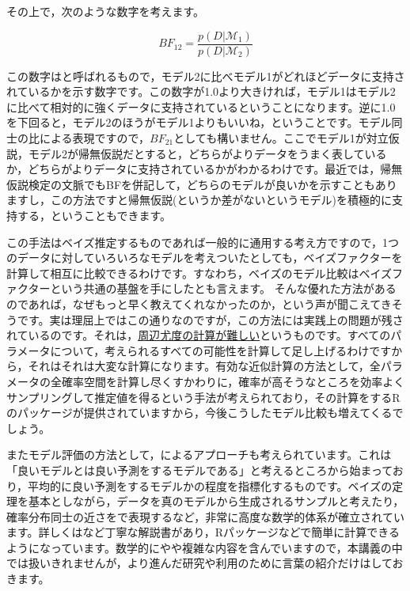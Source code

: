 \documentclass{ltjsbook}
\begin{document}
その上で，次のような数字を考えます。

\[ BF_{12} = \frac{p(D| \mathcal{M}_1)}{p(D| \mathcal{M}_2)} \]

この数字はと呼ばれるもので，モデル2に比べモデル1がどれほどデータに支持されているかを示す数字です。この数字が1.0より大きければ，モデル1はモデル2に比べて相対的に強くデータに支持されているということになります。逆に1.0を下回ると，モデル2のほうがモデル1よりもいいね，ということです。モデル同士の比による表現ですので，$BF_{21}$としても構いません。ここでモデル1が対立仮説，モデル2が帰無仮説だとすると，どちらがよりデータをうまく表しているか，どちらがよりデータに支持されているかがわかるわけです。最近では，帰無仮説検定の文脈でもBFを併記して，どちらのモデルが良いかを示すこともありますし，この方法ですと帰無仮説(というか差がないというモデル)を積極的に支持する，ということもできます。

この手法はベイズ推定するものであれば一般的に通用する考え方ですので，1つのデータに対していろいろなモデルを考えついたとしても，ベイズファクターを計算して相互に比較できるわけです。すなわち，ベイズのモデル比較はベイズファクターという共通の基盤を手にしたとも言えます。
そんな優れた方法があるのであれば，なぜもっと早く教えてくれなかったのか，という声が聞こえてきそうです。実は理屈上ではこの通りなのですが，この方法には実践上の問題が残されているのです。それは，\underline{周辺尤度の計算が難しい}というものです。すべてのパラメータについて，考えられるすべての可能性を計算して足し上げるわけですから，それはそれは大変な計算になります。有効な近似計算の方法として，全パラメータの全確率空間を計算し尽くすかわりに，確率が高そうなところを効率よくサンプリングして推定値を得るという手法が考えられており，その計算をするRのパッケージ\textcite{bridgesampling}が提供されていますから，今後こうしたモデル比較も増えてくるでしょう。

またモデル評価の方法として，によるアプローチも考えられています。これは「良いモデルとは良い予測をするモデルである」と考えるところから始まっており，平均的に良い予測をするモデルかの程度を指標化するものです。ベイズの定理を基本としながら，データを真のモデルから生成されるサンプルと考えたり，確率分布同士の近さをで表現するなど，非常に高度な数学的体系が確立されています。詳しくは\textcite{Hamada201912}など丁寧な解説書があり，Rパッケージなどで簡単に計算できるようになっています\textcite{loo}。数学的にやや複雑な内容を含んでいますので，本講義の中では扱いきれませんが，より進んだ研究や利用のために言葉の紹介だけはしておきます。
\end{document}
